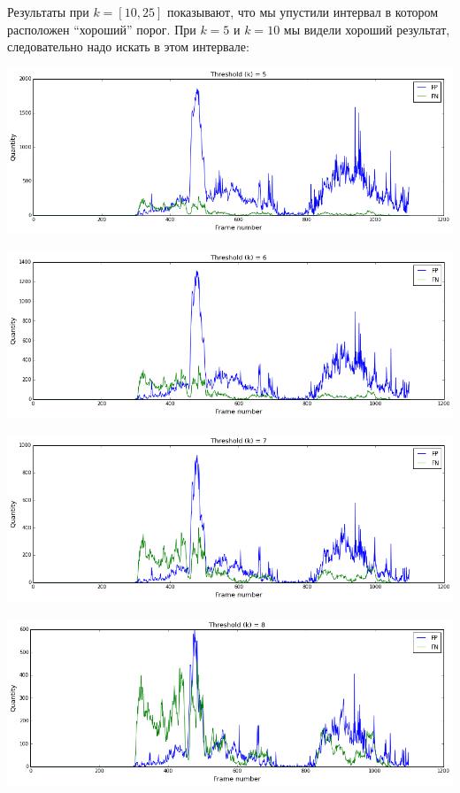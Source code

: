 \documentclass[12pt, a4paper]{article}
\begin{document}
			Результаты при $k = [10, 25]$ показывают, что мы упустили интервал в котором расположен ``хороший'' порог. При $k = 5$ и $k = 10$ мы видели хороший результат, следовательно надо искать в этом интервале:
			\begin{center}
				\includegraphics[width=17cm]{2par_k_5.png}
			\end{center}
			\begin{center}
				\includegraphics[width=17cm]{2par_k_6.png}
			\end{center}
			\begin{center}
				\includegraphics[width=17cm]{2par_k_7.png}
			\end{center}
			\begin{center}
				\includegraphics[width=17cm]{2par_k_8.png}
			\end{center}
\end{document}
